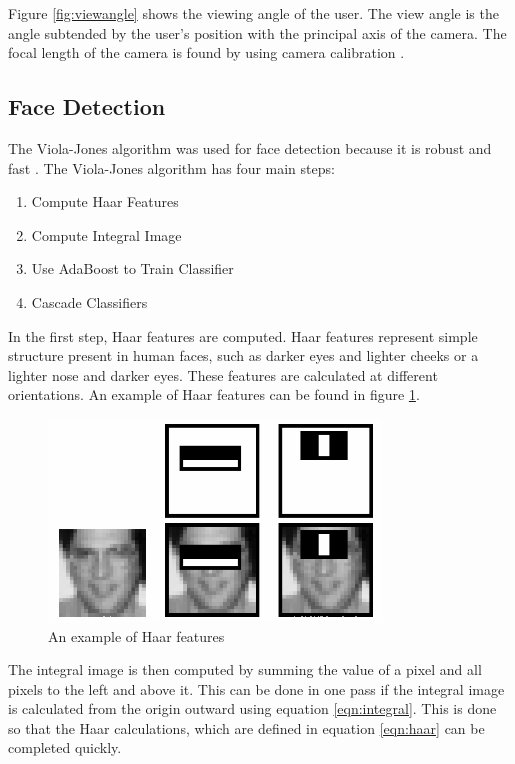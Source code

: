 \documentclass[12pt,twocolumn,letterpaper]{article}
\begin{document}
Figure \ref{fig:viewangle} shows the viewing angle of the user. The view angle is the angle subtended by the user's position with the principal axis of the camera. The focal length of the camera is found by using camera calibration \cite{calibration}. 

\subsection{Face Detection}
The Viola-Jones algorithm was used for face detection because it is robust and fast \cite{Viola-Jones}.  The Viola-Jones algorithm has four main steps:

\begin{enumerate}
\item Compute Haar Features
\item Compute Integral Image
\item Use AdaBoost to Train Classifier
\item Cascade Classifiers
\end{enumerate}

In the first step, Haar features are computed.  Haar features represent simple structure present in human faces, such as darker eyes and lighter cheeks or a lighter nose and darker eyes.  These features are calculated at different orientations. An example of Haar features can be found in figure \ref{fig:Haar}.

\begin{figure}[!htbp]
\centering
\includegraphics[scale=0.5]{images/haar}
\caption{An example of Haar features}
\label{fig:Haar}
\end{figure}

The integral image is then computed by summing the value of a pixel and all pixels to the left and above it.  This can be done in one pass if the integral image is calculated from the origin outward using equation \ref{eqn:integral}. This is done so that the Haar calculations, which are defined in equation \ref{eqn:haar} can be completed quickly.
\end{document}

